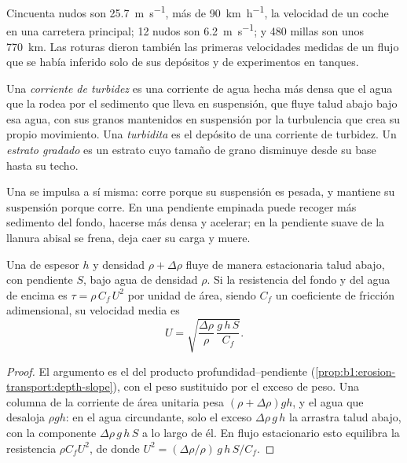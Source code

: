 Cincuenta nudos son \qty{25.7}{m.s^{-1}}, más de \qty{90}{km.h^{-1}}, la velocidad de un coche en una carretera principal; 12 nudos son \qty{6.2}{m.s^{-1}}; y 480 millas son unos
\qty{770}{km}. Las roturas dieron también las primeras velocidades medidas de un flujo que se había inferido solo de sus depósitos y de experimentos en tanques.

\begin{definition}\label{def:b1:clastic-sediments:turbidite}
Una \emph{corriente de turbidez} es una corriente de agua hecha más densa que el agua que la rodea por el sedimento que lleva en suspensión, que fluye talud
abajo bajo esa agua, con sus granos mantenidos en suspensión por la turbulencia que crea su propio movimiento. Una \emph{turbidita} es el depósito de una corriente de
turbidez. Un \emph{estrato gradado} es un estrato cuyo tamaño de grano disminuye desde su base hasta su techo.
\end{definition}

Una  se impulsa a sí misma: corre porque su suspensión es pesada, y mantiene su suspensión porque corre. En una pendiente empinada puede recoger más sedimento del
fondo, hacerse más densa y acelerar; en la pendiente suave de la llanura abisal se frena, deja caer su carga y muere.

\begin{proposition}\label{prop:b1:clastic-sediments:turbidity}
Una  de espesor $h$ y densidad $\rho + \Delta\rho$ fluye de manera estacionaria talud abajo, con pendiente $S$, bajo agua de densidad $\rho$. Si la resistencia
del fondo y del agua de encima es $\tau = \rho\,C_f\,U^2$ por unidad de área, siendo $C_f$ un coeficiente de fricción adimensional, su velocidad media es
\[
  U = \sqrt{\frac{\Delta\rho}{\rho}\,\frac{g\,h\,S}{C_f}} .
\]
\end{proposition}

\begin{proof}
El argumento es el del producto profundidad--pendiente (\cref{prop:b1:erosion-transport:depth-slope}), con el peso sustituido por el exceso de peso.
Una columna de la corriente de área unitaria pesa $(\rho +
\Delta\rho) g h$, y el agua que desaloja $\rho g h$:
en el agua circundante, solo el exceso $\Delta\rho\,g\,h$ la arrastra talud abajo, con la componente
$\Delta\rho\,g\,h\,S$ a lo largo de él. En flujo estacionario esto equilibra la resistencia $\rho C_f U^2$, de donde $U^2 = (\Delta\rho/\rho)\,g\,h\,S/C_f$.
\end{proof}

